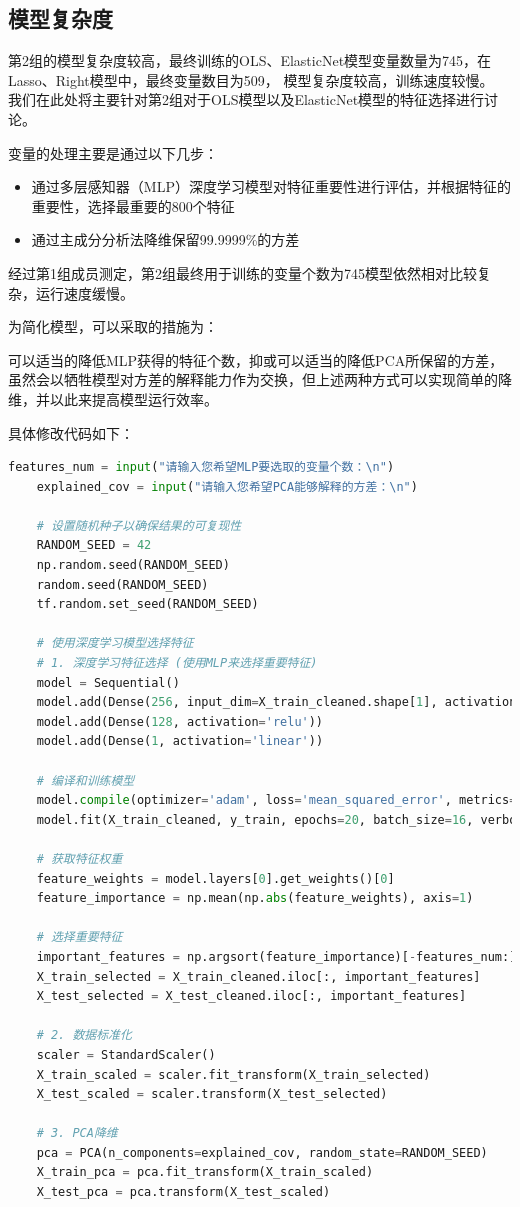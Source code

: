 \documentclass[
    report,     %
    oneside,    %
    UTF8,       %
    zihao=-4    %
]{config} %
\begin{document}
\subsection{模型复杂度}

第2组的模型复杂度较高，最终训练的OLS、ElasticNet模型变量数量为745，在Lasso、Right模型中，最终变量数目为509，
模型复杂度较高，训练速度较慢。
我们在此处将主要针对第2组对于OLS模型以及ElasticNet模型的特征选择进行讨论。

变量的处理主要是通过以下几步：
\begin{itemize}
    \item 通过多层感知器（MLP）深度学习模型对特征重要性进行评估，并根据特征的重要性，选择最重要的800个特征
    \item 通过主成分分析法降维保留99.9999\%的方差
\end{itemize}

经过第1组成员测定，第2组最终用于训练的变量个数为745模型依然相对比较复杂，运行速度缓慢。

为简化模型，可以采取的措施为：

可以适当的降低MLP获得的特征个数，抑或可以适当的降低PCA所保留的方差，虽然会以牺牲模型对方差的解释能力作为交换，但上述两种方式可以实现简单的降维，并以此来提高模型运行效率。

具体修改代码如下：

\begin{lstlisting}[label=code:mlp_pca, language=Python, caption=OLS、ElasticNet模型特征选择改进代码]
    features_num = input("请输入您希望MLP要选取的变量个数：\n")
    explained_cov = input("请输入您希望PCA能够解释的方差：\n")
    
    # 设置随机种子以确保结果的可复现性
    RANDOM_SEED = 42
    np.random.seed(RANDOM_SEED)
    random.seed(RANDOM_SEED)
    tf.random.set_seed(RANDOM_SEED)
    
    # 使用深度学习模型选择特征
    # 1. 深度学习特征选择 (使用MLP来选择重要特征)
    model = Sequential()
    model.add(Dense(256, input_dim=X_train_cleaned.shape[1], activation='relu'))
    model.add(Dense(128, activation='relu'))
    model.add(Dense(1, activation='linear'))
    
    # 编译和训练模型
    model.compile(optimizer='adam', loss='mean_squared_error', metrics=['mean_absolute_error'])
    model.fit(X_train_cleaned, y_train, epochs=20, batch_size=16, verbose=1)
    
    # 获取特征权重
    feature_weights = model.layers[0].get_weights()[0]
    feature_importance = np.mean(np.abs(feature_weights), axis=1)
    
    # 选择重要特征
    important_features = np.argsort(feature_importance)[-features_num:]
    X_train_selected = X_train_cleaned.iloc[:, important_features]
    X_test_selected = X_test_cleaned.iloc[:, important_features]
    
    # 2. 数据标准化
    scaler = StandardScaler()
    X_train_scaled = scaler.fit_transform(X_train_selected)
    X_test_scaled = scaler.transform(X_test_selected)
    
    # 3. PCA降维
    pca = PCA(n_components=explained_cov, random_state=RANDOM_SEED)
    X_train_pca = pca.fit_transform(X_train_scaled)
    X_test_pca = pca.transform(X_test_scaled)
\end{lstlisting}
\end{document}
